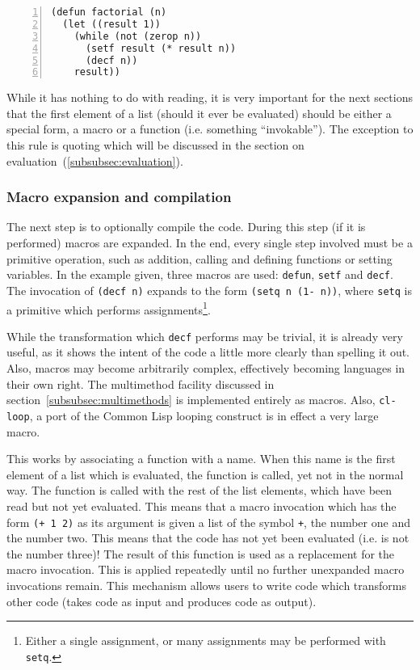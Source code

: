 \documentclass[a4paper,10pt,twoside]{report}
\newcommand{\cl}{Common Lisp}
\newcommand{\sym}[1]{\texttt{#1}}
\newcommand{\fun}[1]{\texttt{#1}}
\begin{document}
\begin{lstlisting}[style=lispcode,label={code:read-example},caption={A function
which calculates the factorial of its argument.},numbers=left]
(defun factorial (n)
  (let ((result 1))
    (while (not (zerop n))
      (setf result (* result n))
      (decf n))
    result))
\end{lstlisting}

While it has nothing to do with reading, it is very important for the next
sections that the first element of a list (should it ever be evaluated) should
be either a special form, a macro or a function (i.e. something ``invokable'').
The exception to this rule is quoting which will be discussed in the section on
evaluation~(\ref{subsubsec:evaluation}).

\subsubsection{Macro expansion and compilation}
\label{subsubsec:compilation}

The next step is to optionally compile the code.  During this step (if it is
performed) macros are expanded.  In the end, every single step involved must be
a primitive operation, such as addition, calling and defining functions or
setting variables.  In the example given, three macros are used: \fun{defun},
\fun{setf} and \fun{decf}.  The invocation of \fun{(decf n)} expands to the form
\texttt{(setq n (1- n))}, where \fun{setq} is a primitive which performs
assignments\footnote{Either a single assignment, or many assignments may be
  performed with \fun{setq}.}.

While the transformation which \fun{decf} performs may be trivial, it is already
very useful, as it shows the intent of the code a little more clearly than
spelling it out.  Also, macros may become arbitrarily complex, effectively
becoming languages in their own right.  The multimethod facility discussed in
section~\ref{subsubsec:multimethods} is implemented entirely as macros.  Also,
\fun{cl-loop}, a port of the \cl{} looping construct is in effect a very large
macro.

This works by associating a function with a name.  When this name is the first
element of a list which is evaluated, the function is called, yet not in the
normal way.  The function is called with the rest of the list elements, which
have been read but not yet evaluated.  This means that a macro invocation which
has the form \texttt{(+ 1 2)} as its argument is given a list of the symbol
\sym{+}, the number one and the number two.  This means that the code has not
yet been evaluated (i.e. is not the number three)!  The result of this function
is used as a replacement for the macro invocation.  This is applied repeatedly
until no further unexpanded macro invocations remain.  This mechanism allows
users to write code which transforms other code (takes code as input and
produces code as output).
\end{document}
